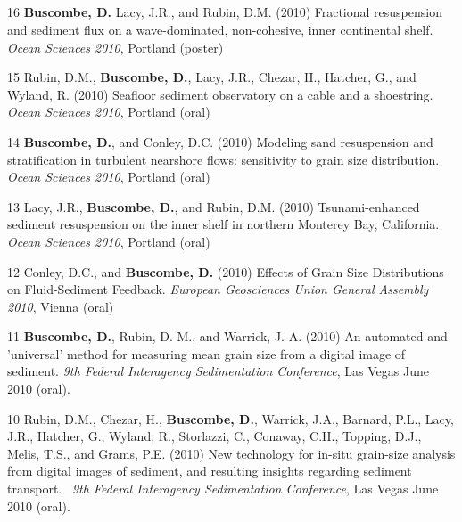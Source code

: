 \documentclass[margin,line]{resume}
\begin{document}
\begin{resume}
\begin{footnotesize}
	\subsection{}
	\begin{list1}
	\item[16] {\bf Buscombe, D.} Lacy, J.R., and Rubin, D.M. (2010) Fractional resuspension and sediment flux on a wave-dominated, non-cohesive, inner continental shelf. {\sl Ocean Sciences 2010}, Portland (poster)\\

	\item[15] Rubin, D.M., {\bf Buscombe, D.}, Lacy, J.R., Chezar, H., Hatcher, G., and Wyland, R. (2010) Seafloor sediment observatory on a cable and a shoestring. {\sl Ocean Sciences 2010}, Portland (oral)\\

	\item[14] {\bf Buscombe, D.}, and Conley, D.C. (2010) Modeling sand resuspension and stratification in turbulent nearshore flows: sensitivity to grain size distribution. {\sl Ocean Sciences 2010}, Portland (oral)\\

	\item[13] Lacy, J.R., {\bf Buscombe, D.}, and Rubin, D.M. (2010) Tsunami-enhanced sediment resuspension on the inner shelf in northern Monterey Bay, California. {\sl Ocean Sciences 2010}, Portland (oral)\\

	\item[12] Conley, D.C., and {\bf Buscombe, D.} (2010) Effects of Grain Size Distributions on Fluid-Sediment Feedback. {\sl European Geosciences Union General Assembly 2010}, Vienna (oral)\\

	\item[11] {\bf Buscombe, D.}, Rubin, D. M., and Warrick, J. A. (2010) An automated and 'universal' method for measuring mean grain size from a digital image of sediment. {\sl 9th Federal Interagency Sedimentation Conference}, Las Vegas June 2010 (oral).\\

	\item[10] Rubin, D.M., Chezar, H., {\bf Buscombe, D.}, Warrick, J.A., Barnard, P.L., Lacy, J.R., Hatcher, G., Wyland, R., Storlazzi, C., Conaway, C.H., Topping, D.J., Melis, T.S., and Grams, P.E. (2010) New technology for in-situ grain-size analysis from digital images of sediment, and resulting insights regarding sediment transport.  {\sl 9th Federal Interagency Sedimentation Conference}, Las Vegas June 2010 (oral).\\


\end{list1}
\end{footnotesize}
\end{resume}
\end{document}
